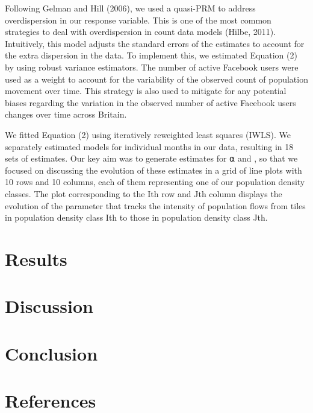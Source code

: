 \documentclass[11pt,letterpaper]{article}
\begin{document}
Following Gelman and Hill (2006), we used a quasi-PRM to address
overdispersion in our response variable. This is one of the most common
strategies to deal with overdispersion in count data models (Hilbe,
2011). Intuitively, this model adjusts the standard errors of the
estimates to account for the extra dispersion in the data. To implement
this, we estimated Equation (2) by using robust variance estimators. The
number of active Facebook users were used as a weight to account for the
variability of the observed count of population movement over time. This
strategy is also used to mitigate for any potential biases regarding the
variation in the observed number of active Facebook users changes over
time across Britain.

We fitted Equation (2) using iteratively reweighted least squares
(IWLS). We separately estimated models for individual months in our
data, resulting in 18 sets of estimates. Our key aim was to generate
estimates for ⍺ and , so that we focused on discussing the evolution of
these estimates in a grid of line plots with 10 rows and 10 columns,
each of them representing one of our population density classes. The
plot corresponding to the Ith row and Jth column displays the evolution
of the parameter that tracks the intensity of population flows from
tiles in population density class Ith to those in population density
class Jth.

\section{Results}\label{sec-results}

\section{Discussion}

\section{Conclusion}

\section{References}
\end{document}

